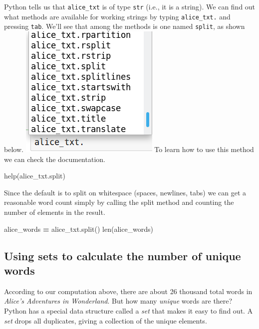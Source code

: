 \documentclass[]{book}
\newenvironment{Shaded}{\begin{snugshade}}{\end{snugshade}}
\newcommand{\OperatorTok}[1]{\textcolor[rgb]{0.81,0.36,0.00}{\textbf{#1}}}
\newcommand{\BuiltInTok}[1]{#1}
\newcommand{\NormalTok}[1]{#1}
\begin{document}
Python tells us that \texttt{alice\_txt} is of type \texttt{str} (i.e.,
it is a string). We can find out what methods are available for working
strings by typing \texttt{alice\_txt.} and pressing \texttt{tab}. We'll
see that among the methods is one named \texttt{split}, as shown below.
\includegraphics{Python/PythonIntro/images/notebook_string_completion.png}
To learn how to use this method we can check the documentation.

\begin{Shaded}
\begin{Highlighting}[]
\BuiltInTok{help}\NormalTok{(alice_txt.split)}
\end{Highlighting}
\end{Shaded}

Since the default is to split on whitespace (spaces, newlines, tabs) we
can get a reasonable word count simply by calling the split method and
counting the number of elements in the result.

\begin{Shaded}
\begin{Highlighting}[]
\NormalTok{alice_words }\OperatorTok{=}\NormalTok{ alice_txt.split()}
\BuiltInTok{len}\NormalTok{(alice_words)}
\end{Highlighting}
\end{Shaded}

\subsection{Using sets to calculate the number of unique
words}\label{using-sets-to-calculate-the-number-of-unique-words}

According to our computation above, there are about 26 thousand total
words in \emph{Alice's Adventures in Wonderland}. But how many
\emph{unique} words are there? Python has a special data structure
called a \emph{set} that makes it easy to find out. A \emph{set} drops
all duplicates, giving a collection of the unique elements.
\end{document}
